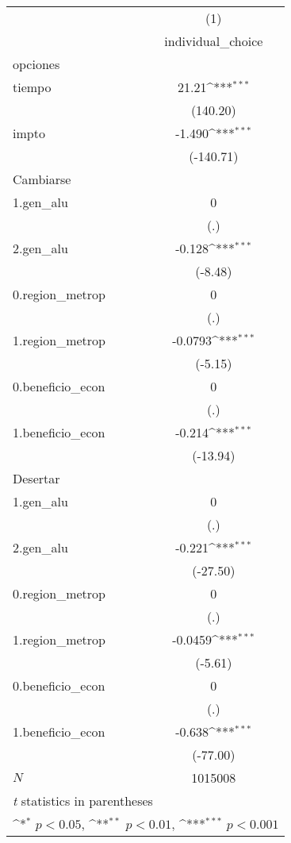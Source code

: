 {
\def\sym#1{\ifmmode^{#1}\else\(^{#1}\)\fi}
\begin{tabular}{l*{1}{c}}
\hline\hline
            &\multicolumn{1}{c}{(1)}\\
            &\multicolumn{1}{c}{individual\_choice}\\
\hline
opciones    &                     \\
tiempo      &       21.21\sym{***}\\
            &    (140.20)         \\
[1em]
impto       &      -1.490\sym{***}\\
            &   (-140.71)         \\
\hline
Cambiarse   &                     \\
1.gen\_alu   &           0         \\
            &         (.)         \\
[1em]
2.gen\_alu   &      -0.128\sym{***}\\
            &     (-8.48)         \\
[1em]
0.region\_metrop&           0         \\
            &         (.)         \\
[1em]
1.region\_metrop&     -0.0793\sym{***}\\
            &     (-5.15)         \\
[1em]
0.beneficio\_econ&           0         \\
            &         (.)         \\
[1em]
1.beneficio\_econ&      -0.214\sym{***}\\
            &    (-13.94)         \\
\hline
Desertar    &                     \\
1.gen\_alu   &           0         \\
            &         (.)         \\
[1em]
2.gen\_alu   &      -0.221\sym{***}\\
            &    (-27.50)         \\
[1em]
0.region\_metrop&           0         \\
            &         (.)         \\
[1em]
1.region\_metrop&     -0.0459\sym{***}\\
            &     (-5.61)         \\
[1em]
0.beneficio\_econ&           0         \\
            &         (.)         \\
[1em]
1.beneficio\_econ&      -0.638\sym{***}\\
            &    (-77.00)         \\
\hline
\(N\)       &     1015008         \\
\hline\hline
\multicolumn{2}{l}{\footnotesize \textit{t} statistics in parentheses}\\
\multicolumn{2}{l}{\footnotesize \sym{*} \(p<0.05\), \sym{**} \(p<0.01\), \sym{***} \(p<0.001\)}\\
\end{tabular}
}
